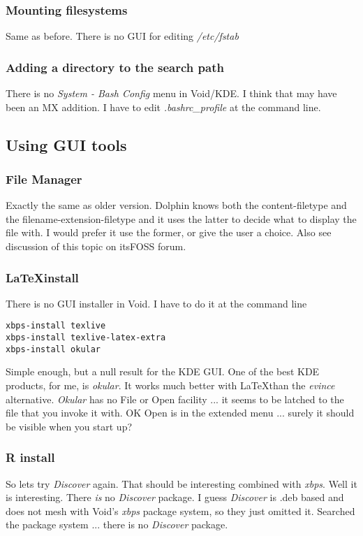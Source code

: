\documentclass{article}  %
\begin{document}
\subsubsection{Mounting filesystems}
Same as before. There is no GUI for editing {\em /etc/fstab}

\subsubsection{Adding a directory to the search path}
There is no {\em System - Bash Config} menu in Void/KDE. I think that may have been an MX addition. I have to edit {\em .bashrc\_profile} at the command line.


\subsection{Using GUI tools }
\subsubsection{File Manager}
Exactly the same as older version. Dolphin knows both the content-filetype and the filename-extension-filetype and it uses the latter to decide what to display the file with. I would prefer it use the former, or give the user a choice. 
Also see discussion of this topic on itsFOSS forum.

\subsubsection{\LaTeX install}
 There is no GUI installer in Void. I have to do it at the command line
\begin{verbatim}
xbps-install texlive
xbps-install texlive-latex-extra
xbps-install okular
\end{verbatim}
Simple enough, but a null result for the KDE GUI.
One of the best KDE products,  for me, is {\em okular}. It works much better with \LaTeX than the {\em evince} alternative. {\em Okular} has no File or Open facility ... it seems to be latched to the file that you invoke it with.   OK Open is in the extended menu ... surely it should be visible when you start up?

\subsubsection{R install}
So lets try {\em Discover} again. That should be interesting combined with {\em xbps}.
Well it is interesting. There {\em is} no {\em Discover} package. I guess {\em Discover} is .deb based and does not mesh with Void's {\em xbps} package system, so they just omitted it. Searched the package system ... there is no {\em Discover} package.
\end{document}
